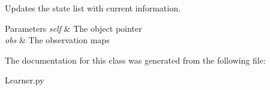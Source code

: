 Updates the state list with current information. 


\begin{DoxyParams}{Parameters}
{\em self} & The object pointer \\
\hline
{\em obs} & The observation maps \\
\hline
\end{DoxyParams}


The documentation for this class was generated from the following file\+:\begin{DoxyCompactItemize}
\item 
Learner.\+py\end{DoxyCompactItemize}
